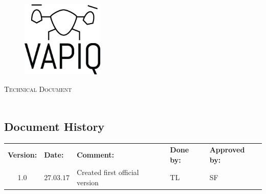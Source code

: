 \documentclass{article}
\author{Aleksander Holthe  \\ Katrine Sundal Haune \\ Kent Kjeldaas \\ Stian Fredriksen \\ Tomas Lyngroth \\ Vanja Katinka Halvorsen}
\makeatletter
\let\vapiqteam\@author
\makeatother
\begin{document}
\begin{titlepage}
    \centering
    \pagecolor{gainsboro}
	\\[3.0 cm]
    \begin{figure}[h]
        \centering
        \includegraphics[width = 0.35\textwidth]{VAPIQ-PICTURES//Logo2_Tilted.png}
        \\[2.0 cm] 
    \end{figure}                              
    \textsc{\Huge Technical Document}  
    \\[1 cm]
    \textsc{\Large }   
    \\[3.0 cm]
	\large \vapiqteam      
\end{titlepage}
\pagecolor{white}


\begin{center}
\section*{\textbf{Document History}}
\begin{tabular}{cllll}
\rowcolor{cadetgrey}
\textbf{Version:}    &\textbf{Date:} 	 &\textbf{Comment:}    &\textbf{Done by:}   &\textbf{Approved by:}  \\
1.0   & $27.03.17$   & Created first official version  & TL  & SF \\
\end{tabular}                                                   
\end{center}
\end{document}
